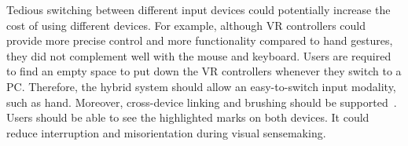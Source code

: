  \label{req:r5}
Tedious switching between different input devices could potentially increase the cost of using different devices. For example, although VR controllers could provide more precise control and more functionality compared to hand gestures, they did not complement well with the mouse and keyboard. Users are required to find an empty space to put down the VR controllers whenever they switch to a PC. Therefore, the hybrid system should allow an easy-to-switch input modality, such as hand.
Moreover, cross-device linking and brushing should be supported~\cite{hubenschmid2022relive}. Users should be able to see the highlighted marks on both devices. It could reduce interruption and misorientation during visual sensemaking.
